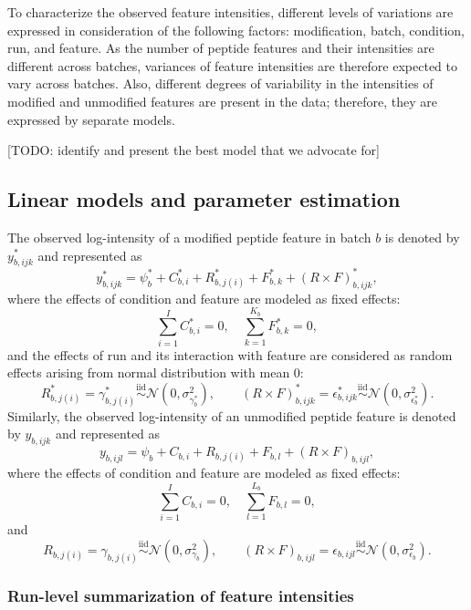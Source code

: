 \documentclass{mcp}
\def\todo#1{{\color{red}[TODO: #1]}}
\begin{document}
To characterize the observed feature intensities, different levels of variations are expressed in consideration of the following factors: modification, batch, condition, run, and feature. As the number of peptide features and their intensities are different across batches, variances of feature intensities are therefore expected to vary across batches. Also, different degrees of variability in the intensities of modified and unmodified features are present in the data; therefore, they are expressed by separate models.

\todo{identify and present the best model that we advocate for}


\subsection{Linear models and parameter estimation}

The observed log-intensity of a modified peptide feature in batch $b$ is denoted by $y_{b,ijk}^{\ast}$ and represented as
\[
y_{b,ijk}^{\ast} = \psi_{b}^{\ast} + C_{b,i}^{\ast} + R_{b,j(i)}^{\ast} + F_{b,k}^{\ast} + (R \times F)_{b,ijk}^{\ast},
\]
where the effects of condition and feature are modeled as fixed effects: 
\[
\sum_{i=1}^{I} C_{b,i}^{\ast} = 0, \quad \sum_{k=1}^{K_b} F_{b,k}^{\ast} = 0,
\]
and the effects of run and its interaction with feature are considered as random effects arising from normal distribution with mean $0$: 
\[
R_{b,j(i)}^{\ast} = \gamma_{b,j(i)}^{\ast} \stackrel{\text{iid}}{\sim} \mathcal{N}(0, \sigma_{\gamma_b^{\ast}}^{2}), \qquad
(R \times F)_{b,ijk}^{\ast} = \epsilon_{b,ijk}^{\ast} \stackrel{\text{iid}}{\sim} \mathcal{N}(0, \sigma_{\epsilon_b^{\ast}}^{2}).
\]
Similarly, the observed log-intensity of an unmodified peptide feature is denoted by $y_{b,ijk}$ and represented as 
\[
y_{b,ijl} = \psi_{b} + C_{b,i} + R_{b,j(i)} + F_{b,l} + (R \times F)_{b,ijl}, 
\]
where the effects of condition and feature are modeled as fixed effects: 
\[
\sum_{i=1}^{I} C_{b,i} = 0, \quad \sum_{l=1}^{L_b} F_{b,l} = 0,
\]
and 
\[
R_{b,j(i)} = \gamma_{b,j(i)} \stackrel{\text{iid}}{\sim} \mathcal{N}(0, \sigma_{\gamma_b}^{2}), \qquad
(R \times F)_{b,ijl} = \epsilon_{b,ijl} \stackrel{\text{iid}}{\sim} \mathcal{N}(0, \sigma_{\epsilon_b}^{2}).
\]


\subsubsection{Run-level summarization of feature intensities}
\end{document}
